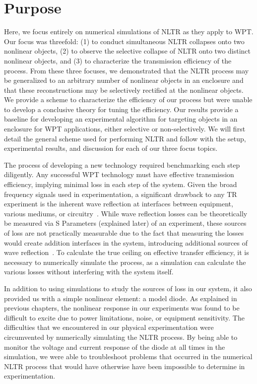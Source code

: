 \section{Purpose}
\label{sec:numerical-purpose}

Here, we focus entirely on numerical simulations of NLTR as they apply to WPT. Our focus was threefold: (1) to conduct simultaneous NLTR collapses onto two nonlinear objects, (2) to observe the selective collapse of NLTR onto two distinct nonlinear objects, and (3) to characterize the transmission efficiency of the process. From these three focuses, we demonstrated that the NLTR process may be generalized to an arbitrary number of nonlinear objects in an enclosure and that these reconstructions may be selectively rectified at the nonlinear objects. We provide a scheme to characterize the efficiency of our process but were unable to develop a conclusive theory for tuning the efficiency. Our results provide a baseline for developing an experimental algorithm for targeting objects in an enclosure for WPT applications, either selective or non-selectively.  We will first detail the general scheme used for performing NLTR and follow with the setup, experimental results, and discussion for each of our three focus topics.

The process of developing a new technology required benchmarking each step diligently. Any successful WPT technology must have effective transmission efficiency, implying minimal loss in each step of the system. Given the broad frequency signals used in experimentation, a significant drawback to any TR experiment is the inherent wave reflection at interfaces between equipment, various mediums, or circuitry~\cite{smith_waves_2010,griffiths_david_introduction_1999}. While wave reflection losses can be theoretically be measured via S Parameters (explained later) of an experiment, these sources of loss are not practically measurable due to the fact that measuring the losses would create addition interfaces in the system, introducing additional sources of wave reflection~\cite{smith_waves_2010}. To calculate the true ceiling on effective transfer efficiency, it is necessary to numerically simulate the process, as a simulation can calculate the various losses without interfering with the system itself.

In addition to using simulations to study the sources of loss in our system, it also provided us with a simple nonlinear element: a model diode. As explained in previous chapters, the nonlinear response in our \giga{} experiments was found to be difficult to excite due to power limitations, noise, or equipment sensitivity. The difficulties that we encountered in our physical experimentation were circumvented by numerically simulating the NLTR process. By being able to monitor the voltage and current response of the diode at all times in the simulation, we were able to troubleshoot problems that occurred in the numerical NLTR process that would have otherwise have been impossible to determine in experimentation.

